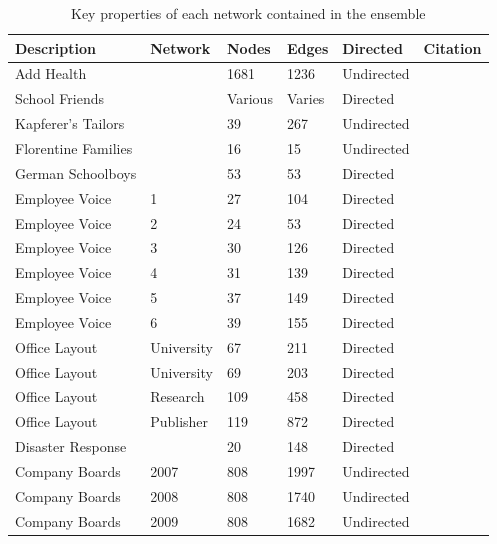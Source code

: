\documentclass[
]{statsoc}
\begin{document}
\begin{longtable}[t]{lllllr}
\caption{\label{tab:network_summaries} Key properties of each network contained in the ensemble}\\
\toprule
Description & Network & Nodes & Edges & Directed  & Citation\\
\midrule
\rowcolor{gray!6}  Add Health &  & 1681 & 1236 & Undirected &  \cite{AddHealth2007}\\
\addlinespace
School Friends &  & Various & Varies & Directed &  \cite{Lubbers2007}\\
\rowcolor{gray!6}  Kapferer's Tailors &  & 39 & 267 & Undirected &  \cite{Robins2007}\\
\addlinespace
Florentine Families &  & 16 & 15 & Undirected &  \cite{Robins2007}\\
\rowcolor{gray!6}  German Schoolboys &  & 53 & 53 & Directed & \cite{Heidler2014}\\
\addlinespace
Employee Voice & 1 & 27 & 104 & Directed & \cite{Pauksktat2011}\\
\rowcolor{gray!6}  Employee Voice & 2 & 24 & 53 & Directed &  \cite{Pauksktat2011}\\
Employee Voice & 3 & 30 & 126 & Directed &  \cite{Pauksktat2011}\\
\rowcolor{gray!6}  Employee Voice & 4 & 31 & 139 & Directed &  \cite{Pauksktat2011}\\
Employee Voice & 5 & 37 & 149 & Directed &  \cite{Pauksktat2011}\\
\rowcolor{gray!6}  Employee Voice & 6 & 39 & 155 & Directed & \cite{Pauksktat2011}\\
\addlinespace
Office Layout & University & 67 & 211 & Directed & \cite{Sailer2012}\\
\rowcolor{gray!6}  Office Layout & University & 69 & 203 & Directed & \cite{Sailer2012}\\
Office Layout & Research & 109 & 458 & Directed & \cite{Sailer2012}\\
\rowcolor{gray!6}  Office Layout & Publisher & 119 & 872 & Directed & \cite{Sailer2012}\\
\addlinespace
Disaster Response &  & 20 & 148 & Directed & \cite{Doreian2012}\\
\addlinespace
\rowcolor{gray!6}  Company Boards & 2007 & 808 & 1997 & Undirected & \cite{Gygax2015}\\
Company Boards & 2008 & 808 & 1740 & Undirected & \cite{Gygax2015}\\
\rowcolor{gray!6}  Company Boards & 2009 & 808 & 1682 & Undirected & \cite{Gygax2015}\\

\end{longtable}
\end{document}
